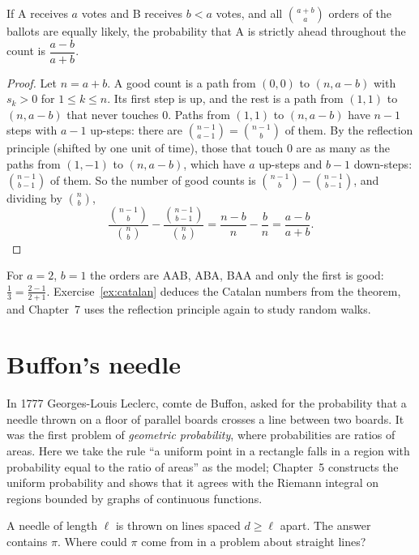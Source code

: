 \begin{theorem}\label{thm:ballot}
If A receives $a$ votes and B receives $b<a$ votes, and all $\binom{a+b}a$ orders of the ballots are equally likely,
the probability that A is strictly ahead throughout the count is $\dfrac{a-b}{a+b}$.
\end{theorem}
\begin{proof}
Let $n=a+b$. A good count is a path from $(0,0)$ to $(n,a-b)$ with $s_k>0$ for $1\le k\le n$. Its first step is
up, and the rest is a path from $(1,1)$ to $(n,a-b)$ that never touches $0$. Paths from $(1,1)$ to $(n,a-b)$ have
$n-1$ steps with $a-1$ up-steps: there are $\binom{n-1}{a-1}=\binom{n-1}b$ of them. By the reflection principle (shifted
by one unit of time), those that touch $0$ are as many as the paths from $(1,-1)$ to $(n,a-b)$, which have $a$
up-steps and $b-1$ down-steps: $\binom{n-1}{b-1}$ of them. So the number of good counts is
$\binom{n-1}b-\binom{n-1}{b-1}$, and dividing by $\binom nb$,
\[
\frac{\binom{n-1}b}{\binom nb}-\frac{\binom{n-1}{b-1}}{\binom nb}=\frac{n-b}n-\frac bn=\frac{a-b}{a+b}.
\]
\end{proof}

For $a=2$, $b=1$ the orders are AAB, ABA, BAA and only the first is good: $\frac13=\frac{2-1}{2+1}$.
Exercise~\ref{ex:catalan} deduces the Catalan numbers from the theorem, and Chapter~7 uses the reflection
principle again to study random walks.

\section{Buffon's needle}

In 1777 Georges-Louis Leclerc, comte de Buffon, asked for the probability that a needle thrown on a floor of
parallel boards crosses a line between two boards. It was the first problem of \emph{geometric probability}, where
probabilities are ratios of areas. Here we take the rule ``a uniform point in a rectangle falls in a region with
probability equal to the ratio of areas'' as the model; Chapter~5 constructs the uniform probability and shows
that it agrees with the Riemann integral on regions bounded by graphs of continuous functions.

\begin{think}
A needle of length $\ell$ is thrown on lines spaced $d\ge\ell$ apart. The answer contains $\pi$. Where could
$\pi$ come from in a problem about straight lines?
\end{think}

